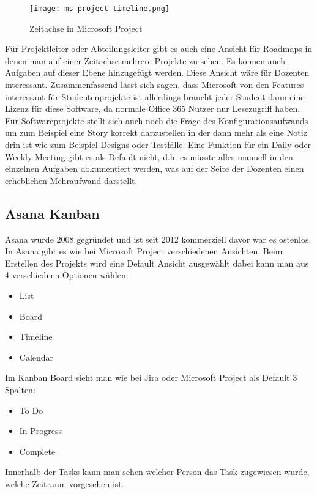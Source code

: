 \begin{figure}[H]
	\centering
	\texttt{[image: ms-project-timeline.png]}
    \caption{Zeitachse in Microsoft Project}
	\label{fig:timelinemsproject}
\end{figure}

Für Projektleiter oder Abteilungsleiter gibt es auch eine Ansicht für Roadmaps in denen man auf einer Zeitachse mehrere Projekte zu sehen. Es können auch Aufgaben auf dieser Ebene hinzugefügt werden. Diese Ansicht wäre für Dozenten interessant. Zusammenfassend lässt sich sagen, dass Microsoft von den Features interessant für Studentenprojekte ist allerdings braucht jeder Student dann eine Lizenz für diese Software, da normale Office 365 Nutzer nur Lesezugriff haben. Für Softwareprojekte stellt sich auch noch die Frage des Konfigurationsaufwands um zum Beispiel eine Story korrekt darzustellen in der dann mehr als eine Notiz drin ist wie zum Beispiel Designs oder Testfälle.  Eine Funktion für ein Daily oder Weekly Meeting gibt es als Default nicht, d.h. es müsste alles manuell in den einzelnen Aufgaben dokumentiert werden, was auf der Seite der Dozenten einen erheblichen Mehraufwand darstellt.  

\subsection{Asana Kanban}

Asana wurde 2008 gegründet und ist seit 2012 kommerziell davor war es ostenlos. In Asana gibt es wie bei Microsoft Project verschiedenen Ansichten. Beim Erstellen des Projekts wird eine Default Ansicht ausgewählt dabei kann man aus 4 verschiednen Optionen wählen:
\begin{itemize}
    \item List 
    \item Board 
    \item Timeline  
    \item Calendar 
\end{itemize}

Im Kanban Board sieht man wie bei Jira oder Microsoft Project als Default 3 Spalten:
\begin{itemize}
    \item To Do
    \item In Progress
    \item Complete
\end{itemize}

Innerhalb der Tasks kann man sehen welcher Person das Task zugewiesen wurde, welche Zeitraum vorgesehen ist.

